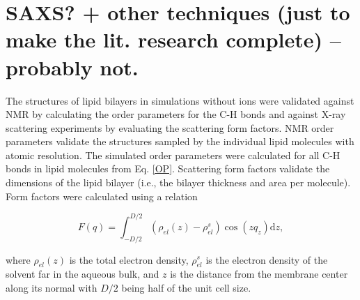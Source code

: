 \section{SAXS? + other techniques (just to make the lit. research complete) -- probably not.}

The structures of lipid bilayers in simulations without ions were validated against NMR by calculating the order parameters for the C-H bonds and against \mbox{X-ray} scattering experiments by evaluating the scattering form factors. 
NMR order parameters validate the structures sampled by the individual lipid molecules with atomic resolution. 
The simulated order parameters were calculated for all C-H bonds in lipid molecules from Eq. \ref{OP}. 
Scattering form factors validate the dimensions of the lipid bilayer (i.e., the bilayer thickness and area per molecule). 
Form factors were calculated using a relation 
 
\begin{equation} 
  F(q) = \int _{-D/2} ^{D/2} \left ( \rho_{el}(z) - \rho_{el}^s \right ) \cos (zq_z) \mathrm{d}z, 
\end{equation} 
 
\noindent where $\rho_{el} (z)$ is the total electron density, $\rho_{el}^s$ is the electron density of the solvent far in the aqueous bulk, and $z$ is the distance from the membrane center along its normal with $D/2$ being half of the unit cell size.   

